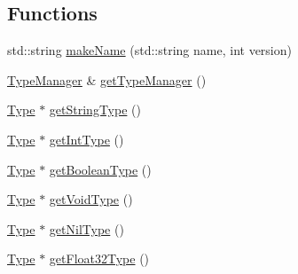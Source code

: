 \subsection*{Functions}
\begin{DoxyCompactItemize}
\item 
std\-::string \hyperlink{namespace_scribble_core_a190e04901a54e1538b0da4ebbc149543}{make\-Name} (std\-::string name, int version)
\item 
\hyperlink{class_scribble_core_1_1_type_manager}{Type\-Manager} \& \hyperlink{namespace_scribble_core_a4042f9dc8c93e8d0e18d7ae614456024}{get\-Type\-Manager} ()
\item 
\hyperlink{class_scribble_core_1_1_type}{Type} $\ast$ \hyperlink{namespace_scribble_core_af3362f13a36274102e4270bdc508213a}{get\-String\-Type} ()
\item 
\hyperlink{class_scribble_core_1_1_type}{Type} $\ast$ \hyperlink{namespace_scribble_core_ac2c1a79ca525acb1fc51da7c986ea3b9}{get\-Int\-Type} ()
\item 
\hyperlink{class_scribble_core_1_1_type}{Type} $\ast$ \hyperlink{namespace_scribble_core_af8df5817c55f0b9d419755816950d0ae}{get\-Boolean\-Type} ()
\item 
\hyperlink{class_scribble_core_1_1_type}{Type} $\ast$ \hyperlink{namespace_scribble_core_a99b82f82490b65c4118ab361700ba918}{get\-Void\-Type} ()
\item 
\hyperlink{class_scribble_core_1_1_type}{Type} $\ast$ \hyperlink{namespace_scribble_core_ae1e28aec9a61765e4fe16c4b347493e4}{get\-Nil\-Type} ()
\item 
\hyperlink{class_scribble_core_1_1_type}{Type} $\ast$ \hyperlink{namespace_scribble_core_aa3f28f968ebb23ba27adb182c1cf77cb}{get\-Float32\-Type} ()
\end{DoxyCompactItemize}

